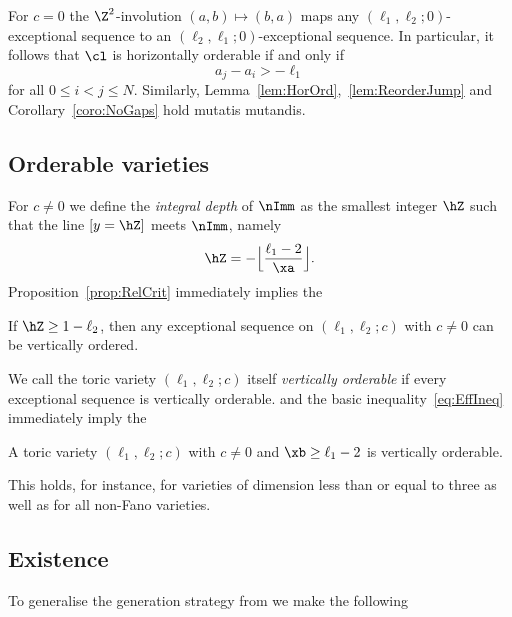 \begin{rema}
\label{rem:RelProdCase}
For $c=0$ the $\Z^2$-involution $(a,b)\mapsto(b,a)$ 
maps any $(\ell_1,\ell_2;0)$-exceptional sequence 
to an $(\ell_2,\ell_1;0)$-exceptional sequence. In 
particular, it follows that $\cl$ is horizontally 
orderable if and only if
\begin{equation}\label{eq:RelBound2}
a_j-a_i>-\ell_1
\end{equation}
for all $0\leq i<j\leq N$. Similarly,
Lemma~\ref{lem:HorOrd},~\ref{lem:ReorderJump}
and Corollary~\ref{coro:NoGaps}
hold mutatis mutandis.
\end{rema}

\subsection{Orderable varieties}
\label{subsec:RelVar}
For $c\not=0$ we define the {\em integral depth} 
of $\nImm$ as the smallest integer $\hZ$ such that 
the line $[y=\hZ]$ meets $\nImm$, namely
\label{page:IntDepth}
\begin{equation}\label{eq:IntDepth}
\hZ=-\Big\lfloor{\frac{\ell_1-2}{\xa}}\Big\rfloor. 
\end{equation}
Proposition~\ref{prop:RelCrit} immediately 
implies the

\begin{coro}\label{coro:RelVar}
If $\hZ\geq1-\ell_2$, then any exceptional 
sequence on $(\ell_1,\ell_2;c)$ with $c\not=0$ 
can be vertically ordered. 
\end{coro}

We call the toric variety $(\ell_1,\ell_2;c)$ 
itself {\em vertically orderable} if every 
exceptional sequence is vertically orderable. 
 and the basic inequality~\eqref{eq:EffIneq} 
immediately imply the
 
\begin{prop}
\label{prop:RelVar}
A toric variety $(\ell_1,\ell_2;c)$ with 
$c\not=0$ and $\xb\geq\ell_1-2$ is vertically 
orderable. 
\end{prop}

This holds, for instance, for varieties of 
dimension less than or equal to three 
as well as for all non-Fano varieties. 

\subsection{Existence}
\label{subsec:ExChain}
To generalise the generation strategy 
from  we make 
the following


